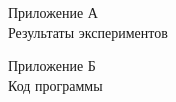 \begin{center}
    Приложение А\\
    Результаты экспериментов
\end{center}
\newpage
\addtocounter{page}{2}
\begin{center}
    Приложение Б\\
    Код программы
\end{center}
